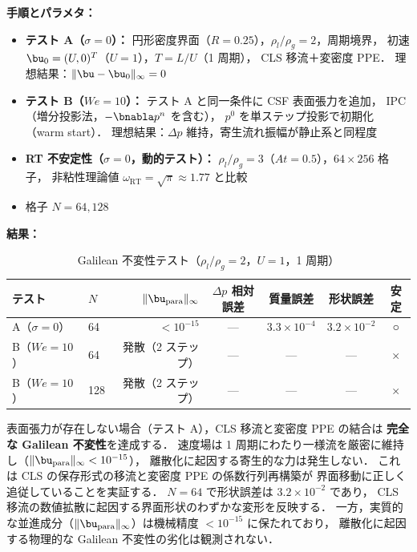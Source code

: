 \noindent\textbf{手順とパラメタ：}
\begin{itemize}[noitemsep]
  \item \textbf{テスト A（$\sigma = 0$）：}
        円形密度界面（$R = 0.25$），$\rho_l/\rho_g = 2$，周期境界，
        初速 $\bu_0 = (U, 0)^T$（$U = 1$），$T = L/U$（1 周期），
        CLS 移流＋変密度 PPE．
        理想結果：$\|\bu - \bu_0\|_\infty = 0$
  \item \textbf{テスト B（$\mathit{We} = 10$）：}
        テスト A と同一条件に CSF 表面張力を追加，
        IPC（増分投影法，$-\bnabla p^n$ を含む），
        $p^0$ を単ステップ投影で初期化（warm start）．
        理想結果：$\Delta p$ 維持，寄生流れ振幅が静止系と同程度
  \item \textbf{RT 不安定性（$\sigma = 0$，動的テスト）：}
        $\rho_l/\rho_g = 3$（$At = 0.5$），$64 \times 256$ 格子，
        非粘性理論値 $\omega_{\mathrm{RT}} = \sqrt{\pi} \approx 1.77$ と比較
  \item 格子 $N = 64, 128$
\end{itemize}

\noindent\textbf{結果：}

\begin{table}[htbp]
\centering
\caption{Galilean 不変性テスト（$\rho_l/\rho_g = 2$，$U = 1$，1 周期）}
\label{tab:galilean}
\renewcommand{\arraystretch}{1.3}
\begin{tabular}{llrcccc}
\toprule
テスト & $N$ & $\|\bu_{\mathrm{para}}\|_\infty$ &
$\Delta p$ 相対誤差 & 質量誤差 & 形状誤差 & 安定 \\
\midrule
A（$\sigma{=}0$） &  64 & $< 10^{-15}$ & --- & $3.3 \times 10^{-4}$ & $3.2 \times 10^{-2}$ & ○ \\
\midrule
B（$\mathit{We}{=}10$）  &  64 & 発散（2 ステップ） & --- & --- & --- & × \\
B（$\mathit{We}{=}10$）  & 128 & 発散（2 ステップ） & --- & --- & --- & × \\
\bottomrule
\end{tabular}
\end{table}

表面張力が存在しない場合（テスト A），CLS 移流と変密度 PPE の結合は
\textbf{完全な Galilean 不変性}を達成する．
速度場は 1 周期にわたり一様流を厳密に維持し（$\|\bu_{\mathrm{para}}\|_\infty < 10^{-15}$），
離散化に起因する寄生的な力は発生しない．
これは CLS の保存形式の移流と変密度 PPE の係数行列再構築が
界面移動に正しく追従していることを実証する．
$N = 64$ で形状誤差は $3.2 \times 10^{-2}$ であり，
CLS 移流の数値拡散に起因する界面形状のわずかな変形を反映する．
一方，実質的な並進成分（$\|\bu_{\mathrm{para}}\|_\infty$）は機械精度 $< 10^{-15}$ に保たれており，
離散化に起因する物理的な Galilean 不変性の劣化は観測されない．


